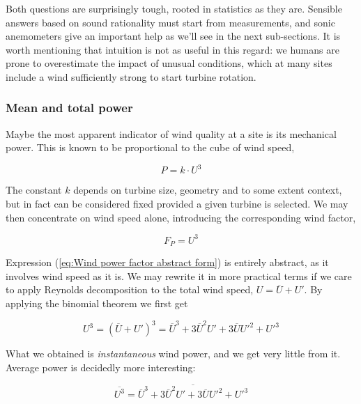 \documentclass[a4paper,10pt]{book}
\begin{document}
Both questions are surprisingly tough, rooted in statistics as they are. Sensible answers based on sound rationality must start from measurements, and sonic anemometers give an important help as we'll see in the next sub-sections. It is worth mentioning that intuition is not as useful in this regard: we humans are prone to overestimate the impact of unusual conditions, which at many sites include a wind sufficiently strong to start turbine rotation.

\subsubsection{Mean and total power}

Maybe the most apparent indicator of wind quality at a site is its mechanical power. This is known to be proportional to the cube of wind speed,

\begin{equation}\label{eq:Wind power abstract form}
  P = k \cdot U^{3}
\end{equation}

The constant $k$ depends on turbine size, geometry and to some extent context, but in fact can be considered fixed provided a given turbine is selected. We may then concentrate on wind speed alone, introducing the corresponding wind factor,

\begin{equation}\label{eq:Wind power factor abstract form}
  F_{P} = U^{3}
\end{equation}

Expression (\ref{eq:Wind power factor abstract form}) is entirely abstract, as it involves wind speed as it is. We may rewrite it in more practical terms if we care to apply Reynolds decomposition to the total wind speed, $U = \overline{U} + U'$. By applying the binomial theorem we first get

\begin{equation}\label{eq:Wind power factor abstract form 2}
  U^{3} = \left( \overline{U} + U' \right)^{3} = \overline{U}^{3} + 3 \overline{U}^{2} U' + 3 \overline{U} U'^{2} + U'^{3}
\end{equation}

What we obtained is \emph{instantaneous} wind power, and we get very little from it. Average power is decidedly more interesting:

\begin{equation}\label{eq:Total wind power factor}
  \overline{U^{3}} = \overline{\overline{U}^{3} + 3 \overline{U}^{2} U' + 3 \overline{U} U'^{2} + U'^{3}}
\end{equation}
\end{document}
